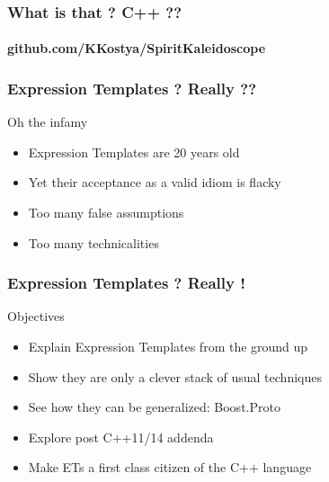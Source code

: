\begin{frame}
\frametitle{What is that ? C++ ??}
\framesubtitle{github.com/KKostya/SpiritKaleidoscope}
\lstspirit
\end{frame}


\begin{frame}
\frametitle{Expression Templates ? Really ??}
\begin{block}{Oh the infamy}
\begin{itemize}
\item Expression Templates are 20 years old
\item Yet their acceptance as a valid idiom is flacky
\item Too many false assumptions
\item Too many technicalities
\end{itemize}
\end{block}{}
\end{frame}

{
}

\begin{frame}
\frametitle{Expression Templates ? Really !}
\begin{block}{Objectives}
\begin{itemize}
\item Explain Expression Templates from the ground up
\item Show they are only a clever stack of usual techniques
\item See how they can be generalized: Boost.Proto
\item Explore post C++11/14 addenda
\item Make ETs a first class citizen of the C++ language
\end{itemize}
\end{block}{}
\end{frame}
